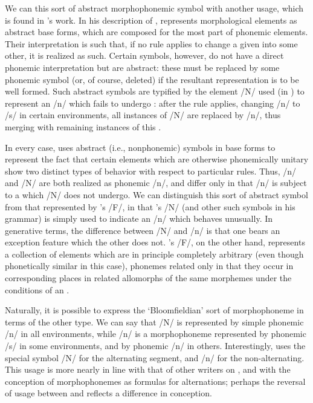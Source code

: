 We can  this sort of abstract morphophonemic symbol with
another usage, which is found in {\Bloomfield}'s work. In his description
of , {\Bloomfield} represents morphological elements as abstract
base forms, which are composed for the most part of phonemic
elements. Their interpretation is such that, if no rule applies to
change a given  into some other, it is realized as
such. Certain symbols, however, do not have a direct phonemic
interpretation but are abstract: these must be replaced by some
phonemic symbol (or, of course, deleted) if the resultant
representation is to be well formed. Such abstract symbols are
typified by the element /N/ used (in \citealt{bloomfield62:menomini})
to represent an /n/ which fails to undergo : after the
 rule applies, changing /n/ to /s/ in certain
environments, all instances of /N/ are replaced by /n/, thus merging
with remaining instances of this .

In every case, {\Bloomfield} uses abstract (i.e., nonphonemic) symbols in
base forms to represent the fact that certain elements which are
otherwise phonemically unitary show two distinct types of behavior
with respect to particular rules. Thus, /n/ and /N/ are both realized
as phonemic /n/, and differ only in that /n/ is subject to a
 which /N/ does not undergo. We can distinguish this
sort of abstract symbol from that represented by {\Harris}'s /F/, in that
{\Bloomfield}'s /N/ (and other such symbols in his grammar) is simply
used to indicate an /n/ which behaves unusually. In generative terms,
the difference between /N/ and /n/ is that one bears an exception
feature which the other does not. {\Harris}'s /F/, on the other hand,
represents a collection of elements which are in principle completely
arbitrary (even though phonetically similar in this case), phonemes
related only in that they occur in corresponding places in related
allomorphs of the same morphemes under the conditions of an
.

Naturally, it is possible to express the `Bloomfieldian' sort of
morphophoneme in terms of the other type. We can say that 
/N/ is represented by simple phonemic /n/ in all environments, while
/n/ is a morphophoneme represented by phonemic /s/ in some
environments, and by phonemic /n/ in others. Interestingly,
\citet{bloomfield:menomini_morphophonemics} uses the special symbol
/N/ for the alternating segment, and /n/ for the non-alternating. This
usage is more nearly in line with that of other writers on
, and with the conception of morphophonemes as formulas
for alternations; perhaps the reversal of usage between
\citealt{bloomfield:menomini_morphophonemics} and
\citealt{bloomfield62:menomini} reflects a difference in conception.

